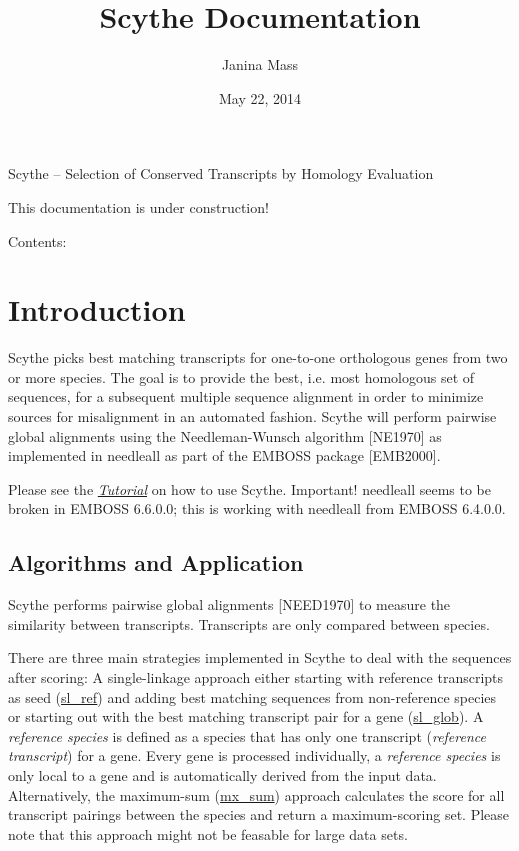 \documentclass[letterpaper,10pt,english]{sphinxmanual}
\title{Scythe Documentation}
\date{May 22, 2014}
\author{Janina Mass}
\begin{document}
\maketitle
\tableofcontents
{}\label{index::doc}


Scythe -- Selection of Conserved Transcripts by Homology Evaluation

This documentation is under construction!

Contents:


\chapter{Introduction}
\label{Introduction:introduction}\label{Introduction::doc}\label{Introduction:welcome-to-scythe-s-documentation}
Scythe picks best matching transcripts for one-to-one orthologous genes from two or more species.
The goal is to provide the best, i.e. most homologous set of sequences, for a subsequent multiple sequence alignment in order
to minimize sources for misalignment in an automated fashion.
Scythe will perform pairwise global alignments using the Needleman-Wunsch algorithm {[}NE1970{]} as implemented in needleall as part of the EMBOSS package {[}EMB2000{]}.

Please see the {\hyperref[Tutorial:tutorial]{\emph{Tutorial}}} on how to use Scythe.
Important! needleall seems to be broken in EMBOSS 6.6.0.0; this is working with needleall from EMBOSS 6.4.0.0.


\section{Algorithms and Application}
\label{Introduction:algorithms-and-application}\label{Introduction:algo}
Scythe performs pairwise global alignments {[}NEED1970{]} to measure the similarity between transcripts.
Transcripts are only compared between species.

There are three main strategies implemented in Scythe to deal with the sequences after scoring:
A single-linkage approach either starting with reference transcripts as seed ({\hyperref[Introduction:sl-ref]{sl\_ref}}) and adding best matching sequences from non-reference species
or starting out with the best matching transcript pair for a gene ({\hyperref[Introduction:sl-glob]{sl\_glob}}).
A \emph{reference species} is defined as a species that has only one transcript (\emph{reference transcript}) for a gene.
Every gene is processed individually, a \emph{reference species} is only local to a gene and is automatically derived from the input data.
Alternatively, the maximum-sum ({\hyperref[Introduction:mx-sum]{mx\_sum}}) approach calculates the score for all transcript pairings between the species and return a maximum-scoring set.
Please note that this approach might not be feasable for large data sets.
\end{document}
